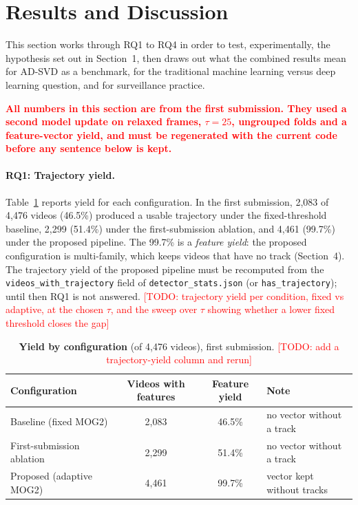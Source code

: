 \documentclass[runningheads]{llncs}
\newcommand{\todo}[1]{\textcolor{red}{[TODO: #1]}}
\begin{document}
\section{Results and Discussion}
\label{sec:results}

This section works through RQ1 to RQ4 in order to test, experimentally, 
the hypothesis set out in Section~1, then draws out what the combined 
results mean for AD-SVD as a benchmark, for the traditional machine 
learning versus deep learning question, and for surveillance practice.

\textcolor{red}{\textbf{All numbers in this section are from the first submission. They used a second model update on relaxed frames, $\tau=25$, ungrouped folds and a feature-vector yield, and must be regenerated with the current code before any sentence below is kept.}}

\paragraph{RQ1: Trajectory yield.}

Table~\ref{tab:yield} reports yield for each configuration. In the first submission, 2,083 of 4,476
videos (46.5\%) produced a usable trajectory under the fixed-threshold baseline, 2,299 (51.4\%)
under the first-submission ablation, and 4,461 (99.7\%) under the proposed pipeline. The 99.7\% is a
\emph{feature yield}: the proposed configuration is multi-family, which keeps videos that have no
track (Section~4). The trajectory yield of the proposed pipeline must be recomputed from the
\texttt{videos\_with\_trajectory} field of \texttt{detector\_stats.json} (or \texttt{has\_trajectory}); until
then RQ1 is not answered. \todo{trajectory yield per condition, fixed vs adaptive, at the chosen $\tau$, and the sweep over $\tau$ showing whether a lower fixed threshold closes the gap}

\begin{table}[htbp]
\centering
\caption{\textbf{Yield by configuration} (of 4,476 videos), first submission. \todo{add a trajectory-yield column and rerun}}
\label{tab:yield}
\fontsize{8}{9.6}\selectfont
\begin{tabular}{lccl}
\toprule
\textbf{Configuration} & \textbf{Videos with features} & \textbf{Feature yield} & \textbf{Note} \\
\midrule
Baseline (fixed MOG2) & 2,083 & 46.5\% & no vector without a track \\
First-submission ablation & 2,299 & 51.4\% & no vector without a track \\
Proposed (adaptive MOG2) & 4,461 & 99.7\% & vector kept without tracks \\
\bottomrule
\end{tabular}
\end{table}
\end{document}
